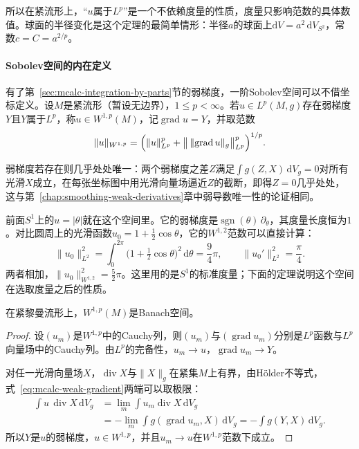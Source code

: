 所以在紧流形上，“$u$属于$L^p$”是一个不依赖度量的性质，度量只影响范数的具体数值。球面的半径变化是这个定理的最简单情形：半径$a$的球面上$\mathrm dV=a^2\,\mathrm dV_{S^2}$，常数$c=C=a^{2/p}$。

\paragraph{Sobolev空间的内在定义}
有了第~\ref{sec:mcalc-integration-by-parts}节的弱梯度，一阶Sobolev空间可以不借坐标定义。设$M$是紧流形（暂设无边界），$1\leq p<\infty$。若$u\in L^p(M,g)$存在弱梯度$Y$且$Y$属于$L^p$，称$u\in W^{1,p}(M)$，记$\operatorname{grad}u=Y$，并取范数
\begin{equation}
\lVert u\rVert_{W^{1,p}}=\Bigl(\lVert u\rVert_{L^p}^p+\bigl\lVert\,\lVert\operatorname{grad}u\rVert_g\bigr\rVert_{L^p}^p\Bigr)^{1/p}.
\label{eq:mcalc-sobolev-norm}
\end{equation}

弱梯度若存在则几乎处处唯一：两个弱梯度之差$Z$满足$\int g(Z,X)\,\mathrm dV_g=0$对所有光滑$X$成立，在每张坐标图中用光滑向量场逼近$Z$的截断，即得$Z=0$几乎处处，这与第~\ref{chap:smoothing-weak-derivatives}章中弱导数唯一性的论证相同。

前面$S^1$上的$u=\lvert\theta\rvert$就在这个空间里。它的弱梯度是$\operatorname{sgn}(\theta)\,\partial_\theta$，其度量长度恒为$1$。对比圆周上的光滑函数$u_0=1+\tfrac12\cos\theta$，它的$W^{1,2}$范数可以直接计算：
\[
\lVert u_0\rVert_{L^2}^2=\int_0^{2\pi}\bigl(1+\tfrac12\cos\theta\bigr)^2\,\mathrm d\theta=\frac94\pi ,\qquad
\lVert u_0'\rVert_{L^2}^2=\frac\pi4 .
\]
两者相加，$\lVert u_0\rVert_{W^{1,2}}^2=\tfrac52\pi$。这里用的是$S^1$的标准度量；下面的定理说明这个空间在选取度量之后的性质。

\begin{theorem}[$W^{1,p}(M)$的完备性]
\label{thm:mcalc-sobolev-complete}
在紧黎曼流形上，$W^{1,p}(M)$是Banach空间。
\end{theorem}

\begin{proof}
设$(u_m)$是$W^{1,p}$中的Cauchy列，则$(u_m)$与$(\operatorname{grad}u_m)$分别是$L^p$函数与$L^p$向量场中的Cauchy列。由$L^p$的完备性，$u_m\to u$，$\operatorname{grad}u_m\to Y$。

对任一光滑向量场$X$，$\operatorname{div}X$与$\lVert X\rVert_g$在紧集$M$上有界，由Hölder不等式，式~\eqref{eq:mcalc-weak-gradient}两端可以取极限：
\[
\begin{aligned}
\int u\,\operatorname{div}X\,\mathrm dV_g&=\lim_m\int u_m\operatorname{div}X\,\mathrm dV_g\\
&=-\lim_m\int g(\operatorname{grad}u_m,X)\,\mathrm dV_g=-\int g(Y,X)\,\mathrm dV_g .
\end{aligned}
\]
所以$Y$是$u$的弱梯度，$u\in W^{1,p}$，并且$u_m\to u$在$W^{1,p}$范数下成立。
\end{proof}

